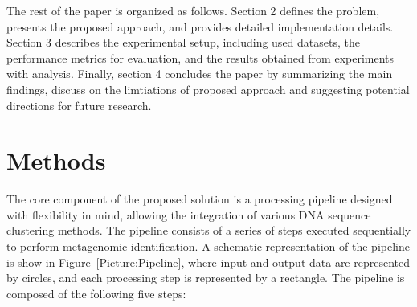 \documentclass[pdflatex,sn-vancouver-num]{sn-jnl}%
\begin{document}
    The rest of the paper is organized as follows. Section 2 defines the problem, presents the proposed approach, and provides detailed implementation details.
    Section 3 describes the experimental setup, including used datasets, the performance metrics for evaluation, and the results obtained from experiments with analysis.
    Finally, section 4 concludes the paper by summarizing the main findings, discuss on the limtiations of proposed approach and suggesting potential directions for future research.

    \section{Methods}

        The core component of the proposed solution is a processing pipeline designed with flexibility in mind, allowing the integration of various DNA sequence clustering methods. The pipeline consists of a series of steps executed sequentially to perform metagenomic identification. A schematic representation of the pipeline is show in Figure~\ref{Picture:Pipeline}, where input and output data are represented by circles, and each processing step is represented by a rectangle. The pipeline is composed of the following five steps:
\end{document}
